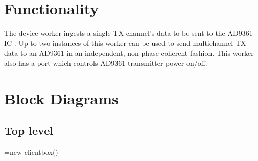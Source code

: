 \section*{Functionality}
	The \Comp{} device worker ingests a single TX channel's data to be sent to the AD9361 IC \cite{ad9361}. Up to two instances of this worker can be used to send multichannel TX data to an AD9361 in an independent, non-phase-coherent fashion. This worker also has a port which controls AD9361 transmitter power on/off.
\section*{Block Diagrams}
\subsection*{Top level}
\makeatletter
\newcommand{\gettikzxy}[3]{%
  \tikz@scan@one@point\pgfutil@firstofone#1\relax
  \edef#2{\the\pgf@x}%
  \edef#3{\the\pgf@y}%
}
\makeatother
{}
\pgfoonew \myclient=new clientbox()
